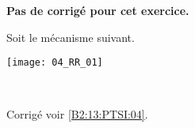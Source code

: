 \normaltrue
\correctionfalse


\setcounter{question}{0}
\ifcorrection
\else
\textbf{Pas de corrigé pour cet exercice.}
\fi

\ifprof
\else
Soit le mécanisme suivant. 
\begin{center}
\texttt{[image: 04\_RR\_01]}
\end{center}
\fi

\ifprof~\\
\else
\fi



\ifprof
\else
\begin{flushright}
\footnotesize{Corrigé  voir \ref{B2:13:PTSI:04}.}
\end{flushright}%
\fi